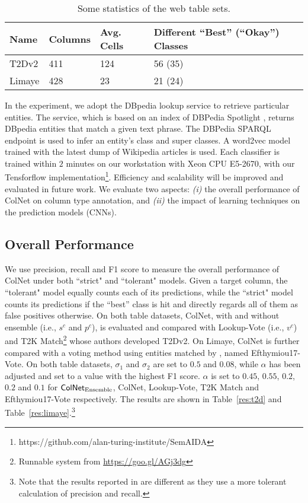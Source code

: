 \documentclass[letterpaper]{article}
\newcommand{\rv}[1]{{\color{black}#1}}
\newcommand{\camera}[1]{{\color{black}#1}}
\newcommand{\ColNet}{\textsf{ColNet}\xspace}
\begin{document}
\begin{table}[h!]
\scriptsize{
\centering
\begin{tabular}[t]{p{1cm}<{\centering}|p{0.9cm}<{\centering}|p{1.1cm}<{\centering}|p{3.5cm}<{\centering}
}
\hline
Name & Columns & Avg. Cells & Different ``Best'' (``Okay'') Classes \\\hline 
T2Dv2 &411&124&56 (35) \\\hline
Limaye &428 &23 &21 (24) \\\hline
\end{tabular}
\caption{
\label{res:datasets}
Some statistics of the web table sets.
}
}
\end{table}


In the experiment, 
we adopt the DBpedia lookup service
to retrieve particular entities. 
The service, which is based on an index of DBPedia Spotlight \cite{mendes2011dbpedia},
returns DBpedia entities that match a given text phrase. The
DBPedia SPARQL endpoint is used to infer an entity's class and super classes.
\camera{A word2vec model trained with the latest dump of Wikipedia articles is used.
Each classifier is trained within $2$ minutes on our workstation with Xeon CPU E5-2670, with our Tensforflow implementation\footnote{https://github.com/alan-turing-institute/SemAIDA}.
Efficiency and scalability will be improved and evaluated in future work.
}
\camera{We evaluate} two aspects:
\textit{(i)} the overall performance of \ColNet on column type annotation, 
and \textit{(ii)} the impact of learning techniques on the prediction models (CNNs).

\subsection{Overall Performance}
We use precision, recall and F1 score to measure the overall performance of \ColNet 
under both ``strict" and ``tolerant" models. 
Given a target column, 
the ``tolerant" model equally counts each of its predictions,
\rv{while the ``strict" model counts its predictions if the ``best'' class is hit and directly regards all of them as false positives otherwise.}
On both table datasets, \ColNet, with and without ensemble (i.e., $s^c$ and $p^c$), is evaluated and compared with Lookup-Vote (i.e., $v^c$) and
T2K Match\footnote{Runnable system from \url{https://goo.gl/AGj3dg}} 
\cite{ritze2015matching} whose authors developed T2Dv2.
\rv{
On Limaye,
\ColNet is further compared with a voting method using entities matched by \cite{efthymiou2017matching}, named Efthymiou17-Vote.}
\rv{On both table datasets, $\sigma_1$ and $\sigma_2$ are set to $0.5$ and $0.08$,
while $\alpha$ has been adjusted and set to a value with the highest F1 score.
$\alpha$ is set to $0.45$, $0.55$, $0.2$, $0.2$ and $0.1$ for $\text{\ColNet}_{\text{Ensemble}}$, \ColNet, Lookup-Vote, T2K Match and Efthymiou17-Vote respectively.
The results are shown in Table~\ref{res:t2d} and Table~\ref{res:limaye}.\footnote{Note that the results reported in \cite{ritze2017web} are different as they use a more tolerant calculation of precision and recall.}
}
\end{document}

